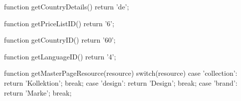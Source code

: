             function getCountryDetails() {
                return 'de';
            }

            function getPriceListID() {
                return '6';
            }

            function getCountryID() {
                return '60';
            }

            function getLanguageID() {
                return '4';
            }

            function getMasterPageResource(resource) {
                switch(resource)  {
                    case 'collection':
                        return 'Kollektion';
                        break;
                    case 'design':
                        return 'Design';
                        break;
                    case 'brand':
                        return 'Marke';
                        break;
                }
            }

